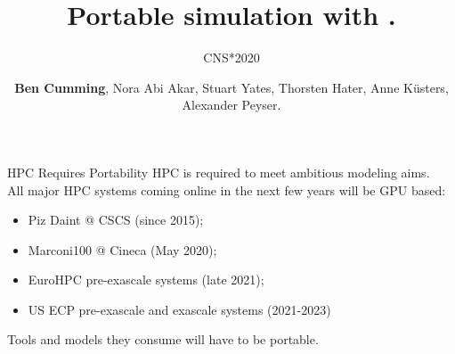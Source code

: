 \documentclass[aspectratio=43]{beamer}
\author{\textbf{Ben Cumming}, Nora Abi Akar, Stuart Yates, Thorsten Hater, Anne K\"usters, Alexander Peyser.}
\title{Portable simulation with \arbor.}
\subtitle{CNS*2020}
\newcommand{\arbor}{{\ttfamily Arbor}\xspace}
\begin{document}
\cscstitle



\begin{frame}[fragile]{HPC Requires Portability}
    HPC is required to meet ambitious modeling aims.
    \\ \vspace{15pt}
    All major HPC systems coming online in the next few years will be GPU based:
    \begin{itemize}
        \item Piz Daint @ CSCS (since 2015);
        \item Marconi100 @ Cineca (May 2020);
        \item EuroHPC pre-exascale systems (late 2021);
        \item US ECP pre-exascale and exascale systems (2021-2023)
    \end{itemize}
    \vspace{15pt}
    Tools and models they consume will have to be portable.
\end{frame}
\end{document}
